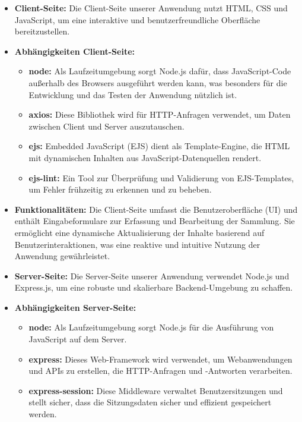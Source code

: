 \begin{itemize}[itemsep=1em, leftmargin=*]
    \item \textbf{Client-Seite:} Die Client-Seite unserer Anwendung nutzt HTML, CSS und JavaScript, um eine interaktive und benutzerfreundliche Oberfläche bereitzustellen.
    \item \textbf{Abhängigkeiten Client-Seite:}
    \begin{itemize}[itemsep=1em, leftmargin=*]
        \vspace{1em}
        \item \textbf{node:} Als Laufzeitumgebung sorgt Node.js dafür, dass JavaScript-Code außerhalb des Browsers ausgeführt werden kann, was besonders für die Entwicklung und das Testen der Anwendung nützlich ist.
        \item \textbf{axios:} Diese Bibliothek wird für HTTP-Anfragen verwendet, um Daten zwischen Client und Server auszutauschen.
        \item \textbf{ejs:} Embedded JavaScript (EJS) dient als Template-Engine, die HTML mit dynamischen Inhalten aus JavaScript-Datenquellen rendert.
        \item \textbf{ejs-lint:} Ein Tool zur Überprüfung und Validierung von EJS-Templates, um Fehler frühzeitig zu erkennen und zu beheben.
    \end{itemize}
    \item \textbf{Funktionalitäten:} Die Client-Seite umfasst die Benutzeroberfläche (UI) und enthält Eingabeformulare zur Erfassung und Bearbeitung der Sammlung.
    Sie ermöglicht eine dynamische Aktualisierung der Inhalte basierend auf Benutzerinteraktionen, was eine reaktive und intuitive Nutzung der Anwendung gewährleistet.
    \item \textbf{Server-Seite:} Die Server-Seite unserer Anwendung verwendet Node.js und Express.js, um eine robuste und skalierbare Backend-Umgebung zu schaffen.
    \item \textbf{Abhängigkeiten Server-Seite:}
    \begin{itemize}[itemsep=1em, leftmargin=*]
        \vspace{1em}
        \item \textbf{node:} Als Laufzeitumgebung sorgt Node.js für die Ausführung von JavaScript auf dem Server.
        \item \textbf{express:} Dieses Web-Framework wird verwendet, um Webanwendungen und APIs zu erstellen, die HTTP-Anfragen und -Antworten verarbeiten.
        \item \textbf{express-session:} Diese Middleware verwaltet Benutzersitzungen und stellt sicher, dass die Sitzungsdaten sicher und effizient gespeichert werden.

\end{itemize}
\end{itemize}
